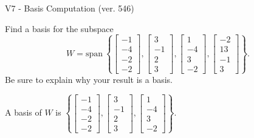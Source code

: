 \begin{exercise}
  \begin{exerciseTitle}V7 - Basis Computation (ver. 546)\end{exerciseTitle}
  \begin{exerciseStatement}
    Find a basis for the subspace 
\[W=\mathrm{span}\ \left\{\left[\begin{array}{r}
-1 \\
-4 \\
-2 \\
-2
\end{array}\right] , \left[\begin{array}{r}
3 \\
-1 \\
2 \\
3
\end{array}\right] , \left[\begin{array}{r}
1 \\
-4 \\
3 \\
-2
\end{array}\right] , \left[\begin{array}{r}
-2 \\
13 \\
-1 \\
3
\end{array}\right]\right\}.\]
 Be sure to explain why your result is a basis.


  \end{exerciseStatement}
  \begin{exerciseAnswer}
   A basis of \(W\) is  \(\left\{\left[\begin{array}{r}
-1 \\
-4 \\
-2 \\
-2
\end{array}\right] , \left[\begin{array}{r}
3 \\
-1 \\
2 \\
3
\end{array}\right] , \left[\begin{array}{r}
1 \\
-4 \\
3 \\
-2
\end{array}\right]\right\}\).
  


  \end{exerciseAnswer}
\end{exercise}